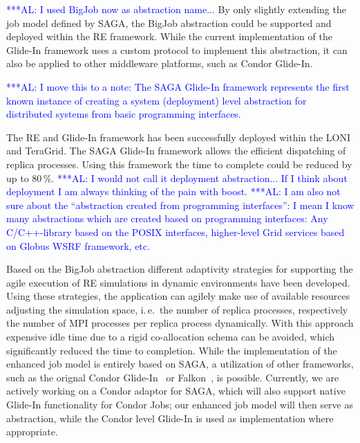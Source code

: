 \documentclass{rspublic}
\newcommand{\alnote}[1]{ {\textcolor{blue} { ***AL: #1 }}}
\newcommand{\alnote}[1]{}
\newcommand{\glidein}[1]{Glide-In }
\begin{document}
{\alnote{I used BigJob now as abstraction name...}
By only slightly extending the job model defined by SAGA, the BigJob 
abstraction could be supported and deployed within the RE framework.  
While the current implementation of the Glide-In framework uses 
a custom protocol to implement this abstraction, it can also be applied 
to other middleware platforms, such as Condor Glide-In. 


\alnote{I move this to a note:
The SAGA \glidein\ framework represents the first known instance of creating a
system (deployment) level abstraction for distributed systems from
basic programming interfaces.} 


The RE and Glide-In framework has been successfully deployed within 
the LONI and TeraGrid. The SAGA Glide-In framework allows the efficient
dispatching of replica processes. Using this framework the time  
to complete could be reduced by up to 80\,\%.  
\alnote{I would not call it deployment abstraction... If I think about
deployment I am always thinking of the pain with boost.}
\alnote{I am also not sure about the ``abstraction created from 
  programming interfaces'': 
  I mean I know many abstractions which are created based on
  programming interfaces: Any C/C++-library based on the POSIX
  interfaces, higher-level Grid services based on Globus WSRF
  framework, etc.}   


       
Based on the BigJob abstraction different adaptivity strategies for supporting
the agile execution of RE simulations in dynamic environments have been
developed. Using these strategies, the application can agilely make use 
of available resources adjusting the simulation space, i.\,e.\ the number 
of replica processes, 
respectively the number of MPI processes per replica process dynamically. 
With this approach expensive idle time due to a rigid co-allocation 
schema can be avoided, which significantly reduced the time to completion. 
While the implementation of the enhanced job model is entirely based
on SAGA, a utilization of other frameworks, such as the orignal Condor
Glide-In~\citep{citeulike:291860} or Falkon~\citep{1362680}, is
possible. Currently, we are actively working on a Condor adaptor for
SAGA, which will also support native Glide-In functionality for Condor
Jobs; our enhanced job model will then serve as abstraction, while the
Condor level Glide-In is used as implementation where appropriate.

}
\end{document}
